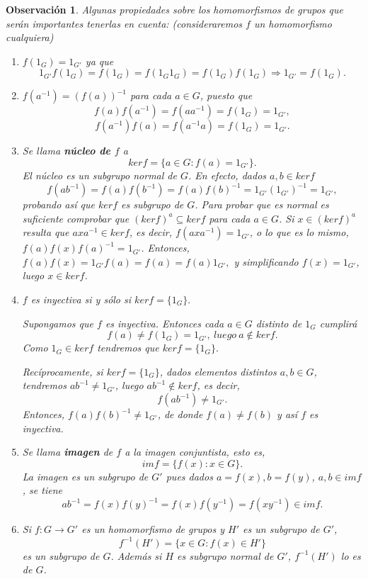 \documentclass[12pt]{article}
\newtheorem{observation}{Observación}[theorem]
\begin{document}
\begin{observation}\label{ob:homs} Algunas propiedades sobre los homomorfismos de grupos que serán importantes tenerlas en cuenta: (consideraremos $f$ un homomorfismo cualquiera)
\begin{enumerate}
\item $f(1_{G}) = 1_{G'}$ ya que $$1_{G'}f(1_{G}) = f(1_{G}) = f(1_{G}1_{G}) = f(1_{G})f(1_{G}) \Longrightarrow 1_{G'} = f(1_{G}).$$
\item $f(a^{-1}) = (f(a))^{-1}$ para cada $a \in G$, puesto que $$f(a)f(a^{-1}) = f(aa^{-1}) = f(1_{G}) = 1_{G'},$$ $$f(a^{-1})f(a) = f(a^{-1}a) = f(1_{G}) = 1_{G'}.$$
\item Se llama \textbf{núcleo de $f$} a $$ker f = \lbrace a \in G: f(a) = 1_{G'} \rbrace.$$
El núcleo es un subgrupo normal de $G$. En efecto, dados $a,b \in ker f$ $$f(ab^{-1}) = f(a)f(b^{-1}) = f(a)f(b)^{-1} = 1_{G'}(1_{G'})^{-1} = 1_{G'},$$ probando así que $ker f$ es subgrupo de $G$. Para probar que es normal es suficiente comprobar que $(ker f)^a \subseteq ker f$ para cada $a \in G$. Si $x \in (ker f)^a$ resulta que $axa^{-1} \in ker f$, es decir, $f(axa^{-1}) = 1_{G'}$, o lo que es lo mismo, $f(a)f(x)f(a)^{-1} = 1_{G'}$. Entonces, $f(a)f(x) = 1_{G'}f(a) = f(a) = f(a)1_{G'},$ y simplificando $f(x) = 1_{G'}$, luego $x \in ker f$.
\item $f$ es inyectiva si y sólo si $ker f = \lbrace 1_G \rbrace.$

Supongamos que $f$ es inyectiva. Entonces cada $a \in G$ distinto de $1_G$ cumplirá $$f(a) \neq f(1_G) = 1_{G'},~luego~a \notin ker f.$$ Como $1_G \in ker f$ tendremos que $ker f = \lbrace 1_G \rbrace.$

Recíprocamente, si $ker f = \lbrace 1_G \rbrace$, dados elementos distintos $a,b \in G$, tendremos $ab^{-1} \neq 1_{G'}$, luego $ab^{-1} \notin ker f$, es decir, $$f(ab^{-1}) \neq 1_{G'}.$$ Entonces, $f(a)f(b)^{-1} \neq 1_{G'}$, de donde $f(a) \neq f(b)$ y así $f$ es inyectiva.
\item Se llama \textbf{imagen} de $f$ a la imagen conjuntista, esto es, $$im f = \lbrace f(x) : x \in G \rbrace.$$ La imagen es un subgrupo de $G'$ pues dados $a = f(x), b = f(y)$, $a,b \in im f$, se tiene $$ab^{-1} = f(x)f(y)^{-1} = f(x)f(y^{-1}) = f(xy^{-1})  \in im f.$$
\item Si $f \colon G \longrightarrow G'$ es un homomorfismo de grupos y $H'$ es un subgrupo de $G'$, $$f^{-1}(H') = \lbrace x \in G : f(x) \in H'\rbrace$$ es un subgrupo de $G$. Además si $H$ es subgrupo normal de $G'$, $f^{-1}(H')$ lo es de $G$.


\end{enumerate}
\end{observation}
\end{document}
